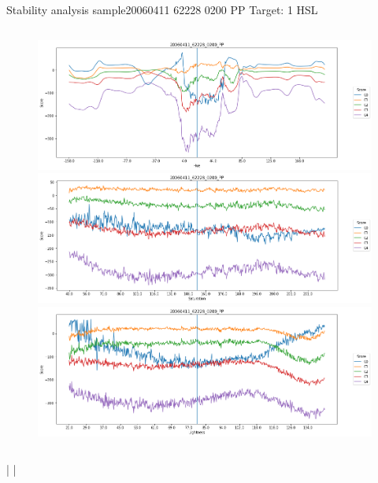 \documentclass{beamer}
\begin{document}
\begin{frame}{Stability analysis sample}{20060411 62228 0200 PP Target: 1 HSL}
\begin{columns}
\begin{column}{0.45\textwidth}
\begin{figure}[p]
			\includegraphics[width=\textwidth]{chapter_stability/20060411_62228_0200_PP/h/scores.png}			\includegraphics[width=\textwidth]{chapter_stability/20060411_62228_0200_PP/s/scores.png}			\includegraphics[width=\textwidth]{chapter_stability/20060411_62228_0200_PP/l/scores.png}
		\end{figure}
	\end{column}
\end{columns}
\href{run:videos_stability/Messidor_20060411_62228_0200_PP_Target_1_Checking_Hue_Sensitivity.mp4}{\color{blue}{Hue}} | \href{run:videos_stability/Messidor_20060411_62228_0200_PP_Target_1_Checking_Saturation_Sensitivity.mp4}{\color{blue}{Saturation}} | \href{run:videos_stability/Messidor_20060411_62228_0200_PP_Target_1_Checking_Luminance_Sensitivity.mp4}{\color{blue}{Lightness}}
\end{frame}
\end{document}
